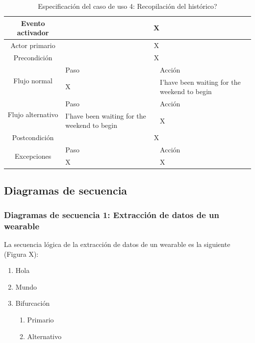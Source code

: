     \begin{table}[h]
        \centering
        \begin{tabularx}{\textwidth}{|c|X|X|}
            \hline
            Evento activador & \multicolumn{2}{|c|}{X} \\
            \hline
            Actor primario & \multicolumn{2}{|c|}{X} \\
            \hline
            Precondición & \multicolumn{2}{|c|}{X} \\
            \hline
            \multirow{2}{*}{Flujo normal} & Paso & Acción \\
            \cline{2-3} & X & I'have been waiting for the weekend to begin \\
            \hline
            \multirow{2}{*}{Flujo alternativo} & Paso & Acción \\
            \cline{2-3} & I'have been waiting for the weekend to begin & X \\
            \hline
            Postcondición & \multicolumn{2}{|c|}{X} \\
            \hline
            \multirow{2}{*}{Excepciones}  & Paso & Acción \\
            \cline{2-3} & X & X \\
            \hline
        \end{tabularx}
        \caption{Especificación del caso de uso 4: Recopilación del histórico?}
        \label{tabla:caso_uso_4}
    \end{table}

\subsection{Diagramas de secuencia}

    \subsubsection{Diagramas de secuencia 1: Extracción de datos de un \gls{wearable}}
        La secuencia lógica de la extracción de datos de un \gls{wearable} es la siguiente (Figura X):

        \begin{enumerate}
            \item Hola
            \item Mundo
            \item Bifurcación
            \begin{enumerate}
                \item Primario
                \item Alternativo
            \end{enumerate}
        \end{enumerate}
    
